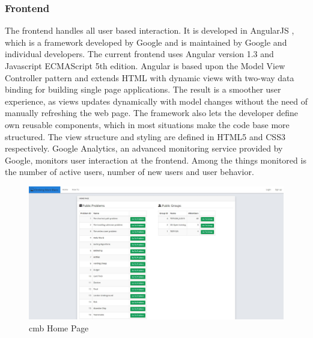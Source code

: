 \subsubsection{Frontend} The frontend handles all user based interaction. It is developed in AngularJS \cite{ANGULARJS}, which is a framework developed by Google and is maintained by Google and individual developers. The current frontend uses Angular version 1.3 and Javascript ECMAScript 5th edition. Angular is based upon the Model View Controller pattern \cite{b:mvc} and extends HTML with dynamic views with two-way data binding for building single page applications. The result is a smoother user experience, as views updates dynamically with model changes without the need of manually refreshing the web page. The framework also lets the developer define own reusable components, which in most situations make the code base more structured. The view structure and styling are defined in HTML5 and CSS3 respectively. Google Analytics, an advanced monitoring service provided by Google, monitors user interaction at the frontend. Among the things monitored is the number of active users, number of new users and user behavior. \\

\begin{figure}
    \centering
    \includegraphics[width=1\textwidth]{figs/front_page.jpg}
    \caption{\gls{cmb} Home Page}
    \label{fig:front-page}
\end{figure}

